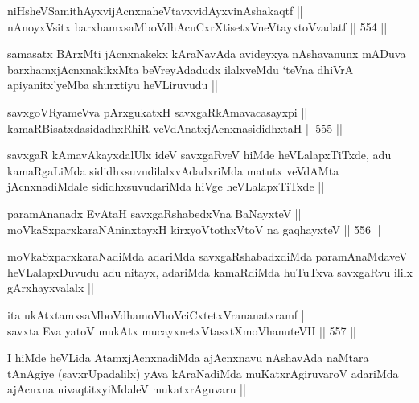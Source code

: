 \begin{shl}
niHsheVSamithAyxvijAcnxnaheVtavxvidAyxvinAshakaqtf || \\
nAnoyxV\s sitx barxhamxsaMboVdhAcuCxrXtisetxVneVtayxtoV\s vadatf ||  554 ||  
\end{shl}

\begin{artha}
samasatx BArxMti jAcnxnakekx kAraNavAda avideyxya nAshavanunx mADuva
barxhamxjAcnxnakikxMta beVreyAdadudx ilalxveMdu `teVna dhiVrA
apiyanitx'yeMba shurxtiyu heVLiruvudu ||
\end{artha}


\begin{shl}
savxgoVR\s yameVva pArxgukatxH savxgaRkAmavacasayxpi || \\
kamaRBisatxdasidadhxRhiR veVdAnatxjAcnxnasididhxtaH ||  555 ||  
\end{shl}

\begin{artha}
savxgaR kAmavAkayxdalUlx ideV savxgaRveV hiMde heVLalapxTiTxde, adu
kamaRgaLiMda sididhxsuvudilalxvAdadxriMda matutx veVdAMta
jAcnxnadiMdale sididhxsuvudariMda hiVge heVLalapxTiTxde ||
\end{artha}

\begin{shl}
paramAnanadx EvAtaH savxgaRshabedxVna BaNayxteV || \\
moVkaSxparxkaraNAninxtayxH kirxyoVtothxV\s toV na gaqhayxteV ||  556 ||  
\end{shl}	

\begin{artha}
moVkaSxparxkaraNadiMda adariMda savxgaRshabadxdiMda paramAnaMdaveV
heVLalapxDuvudu adu nitayx, adariMda kamaRdiMda huTuTxva savxgaRvu
ililx gArxhayxvalalx ||
\end{artha}


\begin{shl}
ita ukAtxtamxsaMboVdhamoVhoVciCxtetxVrananatxramf || \\
savxta Eva yatoV mukAtx mucayxnetxV\s tasxtXmoVhanuteVH ||  557 ||  
\end{shl}

\begin{artha}
I hiMde heVLida AtamxjAcnxnadiMda ajAcnxnavu nAshavAda naMtara
tAnAgiye (savxrUpadalilx) yAva kAraNadiMda muKatxrAgiruvaroV adariMda
ajAcnxna nivaqtitxyiMdaleV mukatxrAguvaru ||
\end{artha}

